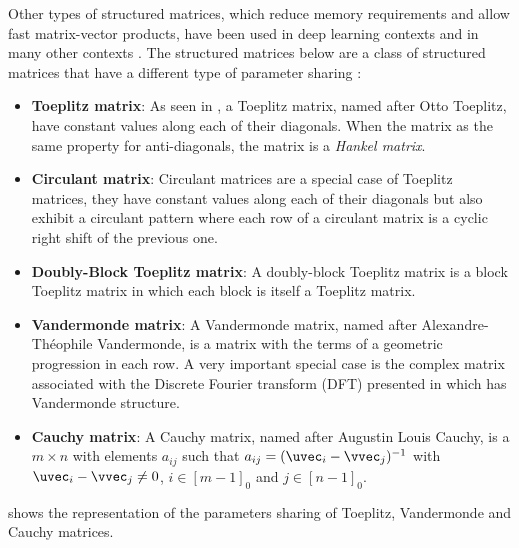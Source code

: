 {%
Other types of structured matrices, which reduce memory requirements and allow fast matrix-vector products, have been used in deep learning contexts and in many other contexts \cite{pan2001structured}.
The structured matrices below are a class of structured matrices that have a different type of parameter sharing :
\begin{itemize}
  \item \textbf{Toeplitz matrix}: As seen in , a Toeplitz matrix, named after Otto Toeplitz, have constant values along each of their diagonals. When the matrix as the same property for anti-diagonals, the matrix is a \emph{Hankel matrix}.
  \item \textbf{Circulant matrix}: Circulant matrices are a special case of Toeplitz matrices, they have constant values along each of their diagonals but also exhibit a circulant pattern where each row of a circulant matrix is a cyclic right shift of the previous one. 
  \item \textbf{Doubly-Block Toeplitz matrix}: A doubly-block Toeplitz matrix is a block Toeplitz matrix in which each block is itself a Toeplitz matrix.
  \item \textbf{Vandermonde matrix}: A Vandermonde matrix, named after Alexandre-Théophile Vandermonde, is a matrix with the terms of a geometric progression in each row.  
    A very important special case is the complex matrix associated with the Discrete Fourier transform (DFT) presented in  which has Vandermonde structure.
  \item \textbf{Cauchy matrix}: A Cauchy matrix, named after Augustin Louis Cauchy, is a $m \times n$ with elements $a_{ij}$ such that $a_{ij} = (\uvec_i - \vvec_j)^{-1}$ with $\uvec_i - \vvec_j \neq 0$, $i \in [m-1]_0$ and $j \in [n-1]_0$.
\end{itemize}
 shows the representation of the parameters sharing of Toeplitz, Vandermonde and Cauchy matrices.

}
